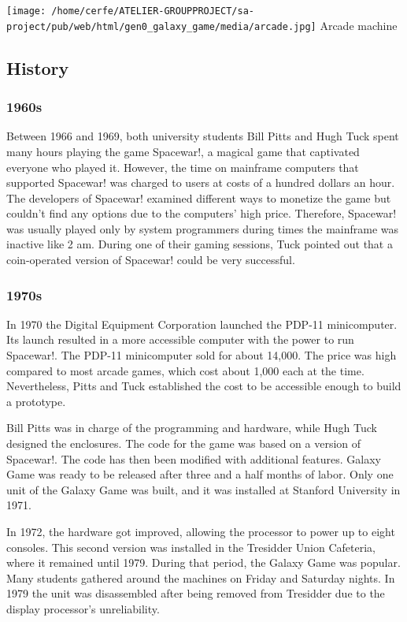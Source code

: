 \documentclass[a4paper,10pt]{book}
\begin{document}
 
 
 \texttt{[image: /home/cerfe/ATELIER-GROUPPROJECT/sa-project/pub/web/html/gen0\_galaxy\_game/media/arcade.jpg]}
 Arcade machine 
 
 \subsection{History }
 \subsubsection{1960s }
 
          Between 1966 and 1969, both university students Bill Pitts and Hugh Tuck spent many hours playing the game Spacewar!, a magical game that captivated everyone who played it.  
          However, the time on mainframe computers that supported Spacewar! was charged to users at costs of a hundred dollars an hour. The developers of Spacewar! examined different ways to monetize the game but couldn't find any options due to the computers' high price. 
          Therefore, Spacewar! was usually played only by system programmers during times the mainframe was inactive like 2 am. 
          During one of their gaming sessions, Tuck pointed out that a coin-operated version of Spacewar! could be very successful.
           
 \subsubsection{1970s }
 
            In 1970 the Digital Equipment Corporation launched the PDP-11 minicomputer. Its launch resulted in a more accessible computer with the power to run Spacewar!. The PDP-11 minicomputer sold for about  14,000. The price was high compared to most arcade games, which cost about  1,000 each at the time. Nevertheless, Pitts and Tuck established the cost to be accessible enough to build a prototype.
           
 
            Bill Pitts was in charge of the programming and hardware, while Hugh Tuck designed the enclosures. The code for the game was based on a version of Spacewar!. The code has then been modified with additional features. Galaxy Game was ready to be released after three and a half months of labor. 
            Only one unit of the Galaxy Game was built, and it was installed at Stanford University in 1971.
           
 In 1972, the hardware got improved, allowing the processor to power up to eight consoles. This second version was installed in the Tresidder Union Cafeteria, where it remained until 1979. 
             During that period, the Galaxy Game was popular. Many students gathered around the machines on Friday and Saturday nights. In 1979 the unit was disassembled after being removed from Tresidder due to the display processor's unreliability.
           
\end{document}
